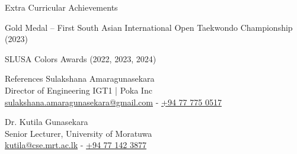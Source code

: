\documentclass[11pt]{resume}
\begin{document}

\begin{rSection}{Extra Curricular Achievements}
\item Gold Medal – First South Asian International Open Taekwondo Championship (2023)
\item SLUSA Colors Awards (2022, 2023, 2024)
\end{rSection}


\begin{rSection}{References}
Sulakshana Amaragunasekara \\
Director of Engineering IGT1 | Poka Inc \\
\href{mailto:sulakshana.amaragunasekara@gmail.com}{sulakshana.amaragunasekara@gmail.com} - \href{tel:+94777750517}{+94 77 775 0517}

\medskip
Dr. Kutila Gunasekara \\
Senior Lecturer, University of Moratuwa \\
\href{mailto:kutila@cse.mrt.ac.lk}{kutila@cse.mrt.ac.lk} - \href{tel:+94771423877}{+94 77 142 3877}
\end{rSection}
\end{document}
